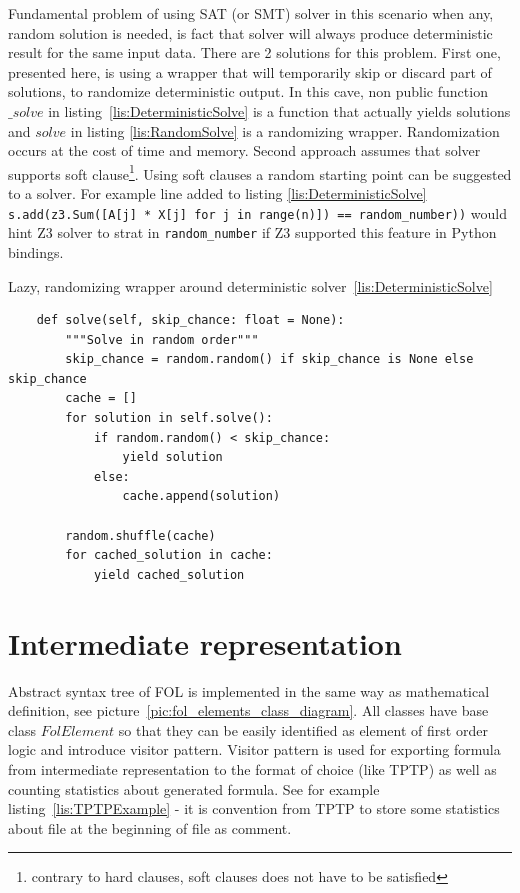 Fundamental problem of using SAT (or SMT) solver in this scenario when any, random solution is needed, is fact that solver will always produce deterministic result for the same input data. There are 2 solutions for this problem. First one, presented here, is using a wrapper that will temporarily skip or discard part of solutions, to randomize deterministic output. In this cave, non public function $\_solve$ in listing~\ref{lis:DeterministicSolve} is a function that actually yields solutions and $solve$ in listing \ref{lis:RandomSolve} is a randomizing wrapper. Randomization occurs at the cost of time and memory. Second approach assumes that solver supports soft clause\footnote{contrary to hard clauses, soft clauses does not have to be satisfied}. Using soft clauses a random starting point can be suggested to a solver. For example line added to listing \ref{lis:DeterministicSolve} \texttt{s.add(z3.Sum([A[j] * X[j] for j in range(n)]) == random_number))} would hint Z3 solver to strat in \texttt{random_number} if Z3 supported this feature in Python bindings.

\begin{listing}[H]
  \caption{Lazy, randomizing wrapper around deterministic solver~\ref{lis:DeterministicSolve}}
  \label{lis:RandomSolve}
\begin{verbatim}
    def solve(self, skip_chance: float = None):
        """Solve in random order"""
        skip_chance = random.random() if skip_chance is None else skip_chance
        cache = []
        for solution in self.solve():
            if random.random() < skip_chance:
                yield solution
            else:
                cache.append(solution)

        random.shuffle(cache)
        for cached_solution in cache:
            yield cached_solution
\end{verbatim}
\end{listing}

\section{Intermediate representation}

Abstract syntax tree of \gls{FOL} is implemented in the same way as mathematical definition, see picture~\ref{pic:fol_elements_class_diagram}. All classes have base class $FolElement$ so that they can be easily identified as element of first order logic and introduce visitor pattern. Visitor pattern is used for exporting formula from intermediate representation to the format of choice (like \gls{TPTP}) as well as counting statistics about generated formula. See for example listing~\ref{lis:TPTPExample} - it is convention from TPTP to store some statistics about file at the beginning of file as comment.

